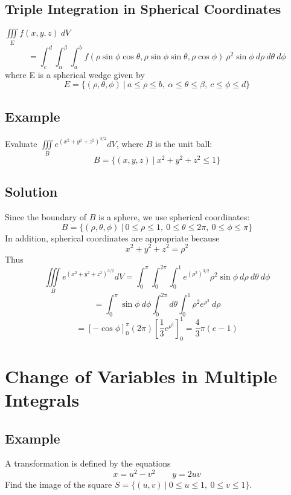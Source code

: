 \subsection*{Triple Integration in Spherical Coordinates}
$\iiint\limits_E f(x,y,z)\:dV$
$$=\int_c^d\int_\alpha^\beta\int_a^b f(\rho\sin{\phi}\cos{\theta},
    \rho\sin{\phi}\sin{\theta},\rho\cos{\phi})\:\rho^2\sin{\phi}\:d\rho\:d\theta\:d\phi$$
where E is a spherical wedge given by
$$E=\{(\rho,\theta,\phi)\:|\:a\leq\rho\leq b,\: \alpha\leq\theta\leq\beta,\:c\leq\phi\leq d\}$$

\subsection*{Example}
Evaluate $\iiint\limits_B e^{(x^2+y^2+z^2)^{3/2}}dV$, where $B$ is the unit ball:
$$B=\{(x,y,z)\:|\: x^2+y^2+z^2\leq 1\}$$

\subsection*{Solution}
Since the boundary of $B$ is a sphere, we use spherical coordinates:
$$B=\{(\rho,\theta,\phi)\:|\:0\leq\rho\leq 1,\: 0\leq\theta\leq 2\pi,\:0\leq\phi\leq\pi\}$$
In addition, spherical coordinates are appropriate because
$$x^2+y^2+z^2=\rho^2$$
Thus
$$\iiint\limits_B e^{(x^2+y^2+z^2)^{3/2}}dV=\int_0^\pi\int_0^{2\pi}\int_0^1 e^{(\rho^2)^{3/2}}
    \rho^2\sin{\phi}\:d\rho\:d\theta\:d\phi$$
$$=\int_0^\pi\sin{\phi}\:d\phi\int_0^{2\pi}d\theta\int_0^1\rho^2e^{\rho^3}\:d\rho$$
$$=\left[-\cos{\phi}\right]_0^\pi (2\pi)\left[\frac{1}{3}e^{\rho^3}\right]_0^1=\frac{4}{3}\pi(e-1)$$

\section{Change of Variables in Multiple Integrals}

\subsection*{Example}
A transformation is defined by the equations
$$x=u^2-v^2 \qquad y=2uv$$
Find the image of the square $S=\{(u,v)\:|\:0\leq u\leq 1,\: 0\leq v\leq 1\}$.

